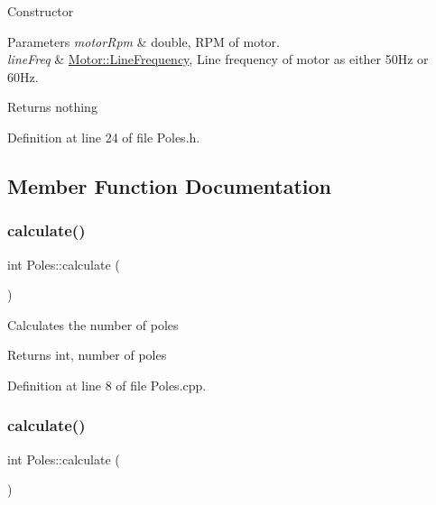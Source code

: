 Constructor 
\begin{DoxyParams}{Parameters}
{\em motor\+Rpm} & double, R\+PM of motor. \\
\hline
{\em line\+Freq} & \hyperlink{class_motor_acee1bdf1b684ad36cb80dc2829d9fcee}{Motor\+::\+Line\+Frequency}, Line frequency of motor as either 50\+Hz or 60\+Hz. \\
\hline
\end{DoxyParams}
\begin{DoxyReturn}{Returns}
nothing 
\end{DoxyReturn}


Definition at line 24 of file Poles.\+h.



\subsection{Member Function Documentation}
\mbox{\label{class_poles_a23988f68100374c8277dca81ab06f724}} 
\subsubsection{\texorpdfstring{calculate()}{calculate()}\hspace{0.1cm}{\footnotesize\ttfamily [1/3]}}
{\footnotesize\ttfamily int Poles\+::calculate (\begin{DoxyParamCaption}{ }\end{DoxyParamCaption})}

Calculates the number of poles

\begin{DoxyReturn}{Returns}
int, number of poles 
\end{DoxyReturn}


Definition at line 8 of file Poles.\+cpp.

\mbox{\label{class_poles_a23988f68100374c8277dca81ab06f724}} 
\subsubsection{\texorpdfstring{calculate()}{calculate()}\hspace{0.1cm}{\footnotesize\ttfamily [2/3]}}
{\footnotesize\ttfamily int Poles\+::calculate (\begin{DoxyParamCaption}{ }\end{DoxyParamCaption})}

